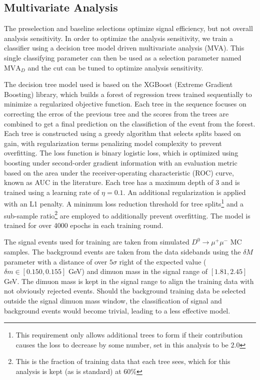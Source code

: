 

\subsection{Multivariate Analysis}
\label{subsec:mva}

The preselection and baseline selections optimize signal efficiency, but not overall analysis sensitivity. In order to optimize the analysis sensitivity, we train a classifier using a decision tree model driven multivariate analysis (MVA). This single classifying parameter can then be used as a selection parameter named $\text{MVA}_D$ and the cut can be tuned to optimize analysis sensitivity.

The decision tree model used is based on the XGBoost (Extreme Gradient Boosting) library, which builds a forest of regression trees trained sequentially to minimize a regularized objective function. Each tree in the sequence focuses on correcting the erros of the previous tree and the scores from the trees are combined to get a final prediction on the classifiction of the event from the forest. Each tree is constructed using a greedy algorithm that selects splits based on gain, with regularization terms penalizing model complexity to prevent overfitting. The loss function is binary logistic loss, which is optimized using boosting under second-order gradient information with an evaluation metric based on the area under the receiver-operating characteristic (ROC) curve, known as AUC in the literature. Each tree has a maximum depth of 3 and is trained using a learning rate of $\eta = 0.1$. An additional regularization is applied with an L1 penalty. A minimum loss reduction threshold for tree splits\footnote{This requirement only allows additional trees to form if their contribution causes the loss to decrease by some number, set in this analysis to be $2.0$} and a sub-sample ratio\footnote{This is the fraction of training data that each tree sees, which for this analysis is kept (as is standard) at $60\%$} are employed to additionally prevent overfitting. The model is trained for over 4000 epochs in each training round.

The signal events used for training are taken from simulated $D^0 \to \mu^+ \mu^-$ MC samples. The background events are taken from the data sidebands using the $\delta M$ parameter with a distance of over $5\sigma$ right of the expected value ($\delta m \in [0.150, 0.155]$ GeV) and dimuon mass in the signal range of $[1.81, 2.45]$ GeV. The dimuon mass is kept in the signal range to align the training data with not obviously rejected events. Should the background training data be selected outside the signal dimuon mass window, the classification of signal and background events would become trivial, leading to a less effective model.

